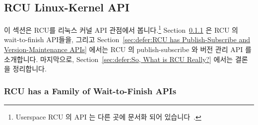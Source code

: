 
\subsection{RCU Linux-Kernel API}
\label{sec:defer:RCU Linux-Kernel API}

이 섹션은 RCU를 리눅스 커널 API 관점에서 봅니다.\footnote{
	Userspace RCU 의 API 는 다른 곳에 문서화 되어
	있습니다~\cite{PaulMcKenney2013LWNURCU}.}
Section~\ref{sec:defer:RCU has a Family of Wait-to-Finish APIs}
은 RCU 의 wait-to-finish API들을, 그리고
Section~\ref{sec:defer:RCU has Publish-Subscribe and Version-Maintenance APIs}
에서는 RCU 의 publish-subscribe 와 버전 관리 API 를 소개합니다.
마지막으로,
Section~\ref{sec:defer:So, What is RCU Really?}
에서는 결론을 정리합니다.

\subsubsection{RCU has a Family of Wait-to-Finish APIs}
\label{sec:defer:RCU has a Family of Wait-to-Finish APIs}

